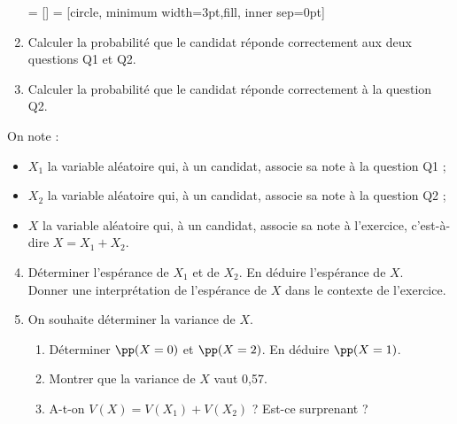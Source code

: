 \documentclass[11pt,fleqn, openany]{book} %
\begin{document}
\begin{exercise}[subtitle={(Sujet zéro 2024)}]
\begin{enumerate}
 = []
 = [circle, minimum width=3pt,fill, inner sep=0pt]


\begin{center}
\end{center}

\item Calculer la probabilité que le candidat réponde correctement aux deux questions Q1 et Q2.
\item Calculer la probabilité que le candidat réponde correctement à la question Q2.\end{enumerate}
On note :
\begin{itemize}
\item $X_1$ la variable aléatoire qui, à un candidat, associe sa note à la question Q1 ;
\item $X_2$ la variable aléatoire qui, à un candidat, associe sa note à la question Q2 ;
\item $X$ la variable aléatoire qui, à un candidat, associe sa note à l'exercice, c'est-à-dire $X = X_1 + X_2$.
\end{itemize}

\begin{enumerate}
\setcounter{enumi}{3}
\item Déterminer l'espérance de $X_1$ et de $X_2$. En déduire l'espérance de $X$.\\ Donner une interprétation de l'espérance de $X$ dans le contexte de l'exercice.
\item On souhaite déterminer la variance de $X$.
\begin{enumerate}
\item Déterminer $\pp(X = 0)$ et $\pp(X = 2)$. En déduire $\pp(X = 1)$.
\item Montrer que la variance de $X$ vaut 0,57.
\item A-t-on $V(X) = V(X_1)+V(X_2)$ ? Est-ce surprenant ?
\end{enumerate} 
\end{enumerate}


\end{exercise}
\end{document}
